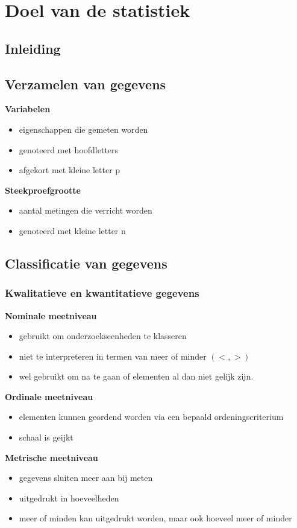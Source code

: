 \documentclass[titlepage]{article}
\numberwithin{equation}{section}
\begin{document}
\begin{titlepage} 

\end{titlepage}

\thispagestyle{empty}
\clearpage\mbox{}\clearpage

\tableofcontents
\newpage
 
\section{Doel van de statistiek}
\subsection{Inleiding}
\subsection{Verzamelen van gegevens}
\textbf{Variabelen} 
\begin{itemize}
  \item eigenschappen die gemeten worden
  \item genoteerd met hoofdletters
  \item afgekort met kleine letter p
\end{itemize}
\textbf{Steekproefgrootte}
\begin{itemize}
  \item aantal metingen die verricht worden
  \item genoteerd met kleine letter n
\end{itemize}
\subsection{Classificatie van gegevens}
\subsubsection{Kwalitatieve en kwantitatieve gegevens}
\textbf{Nominale meetniveau}
\begin{itemize}
  \item gebruikt om onderzoekseenheden te klasseren
  \item niet te interpreteren in termen van meer of minder $(<,>)$
  \item wel gebruikt om na te gaan of elementen al dan niet gelijk zijn.
\end{itemize}
\textbf{Ordinale meetniveau}
\begin{itemize}
	\item elementen kunnen geordend worden via een bepaald ordeningscriterium
	\item schaal is geijkt
\end{itemize}
\textbf{Metrische meetniveau}
\begin{itemize}
	\item gegevens sluiten meer aan bij meten
	\item uitgedrukt in hoeveelheden
	\item meer of minden kan uitgedrukt worden, maar ook hoeveel meer of minder
\end{itemize}
\end{document}

